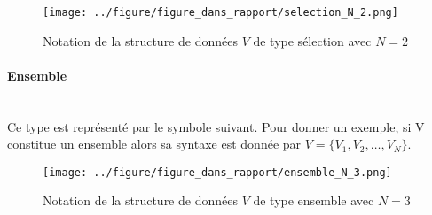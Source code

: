 \begin{figure}[H]
    \centering
    \texttt{[image: ../figure/figure\_dans\_rapport/selection\_N\_2.png]}
    \caption{Notation de la structure de données $V$ de type sélection avec $N=2$}
    \label{fig:selection_N_2}
\end{figure}

\paragraph{Ensemble} ~~\\ \noindent
Ce type est représenté par le symbole suivant. Pour donner un exemple, si V constitue un ensemble alors sa syntaxe est donnée par $V=\{V_1,V_2,\ldots,V_N\}$.

\begin{figure}[H]
    \centering
    \texttt{[image: ../figure/figure\_dans\_rapport/ensemble\_N\_3.png]}
    \caption{Notation de la structure de données $V$ de type ensemble avec $N=3$}
    \label{fig:ensemble_N_3}
\end{figure}
